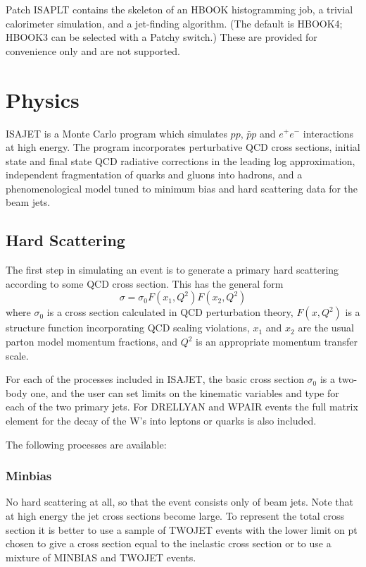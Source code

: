       Patch ISAPLT contains the skeleton of an HBOOK histogramming
job, a trivial calorimeter simulation, and a jet-finding algorithm.
(The default is HBOOK4; HBOOK3 can be selected with a Patchy switch.)
These are provided for convenience only and are not supported.
\newpage
\section{Physics\label{PHYSICS}}

      ISAJET is a Monte Carlo program which simulates $pp$, $\bar pp$
and $e^+e^-$ interactions at high energy. 
The program incorporates
perturbative QCD cross sections, initial state and final state QCD
radiative corrections in the leading log approximation, independent
fragmentation of quarks and gluons into hadrons, and a
phenomenological model tuned to minimum bias and hard scattering data
for the beam jets.

\subsection{Hard Scattering\label{hard}}

      The first step in simulating an event is to generate a primary
hard scattering according to some QCD cross section. This has the
general form
$$
\sigma = \sigma_0  F(x_1,Q^2) F(x_2,Q^2)
$$
where $\sigma_0$ is a cross section calculated in QCD perturbation
theory, $F(x,Q^2)$ is a structure function incorporating QCD scaling
violations, $x_1$ and $x_2$ are the usual parton model momentum
fractions, and $Q^2$ is an appropriate momentum transfer scale.

      For each of the processes included in ISAJET, the basic cross
section $\sigma_0$ is a two-body one, and the user can set limits on
the kinematic variables and type for each of the two primary jets. For
DRELLYAN and WPAIR events the full matrix element for the decay of the
W's into leptons or quarks is also included.

      The following processes are available:

\subsubsection{Minbias} No hard scattering at all, so that the event
consists only of beam jets. Note that at high energy the jet cross
sections become large. To represent the total cross section it is
better to use a sample of TWOJET events with the lower limit on pt
chosen to give a cross section equal to the inelastic cross section or
to use a mixture of MINBIAS and TWOJET events.

